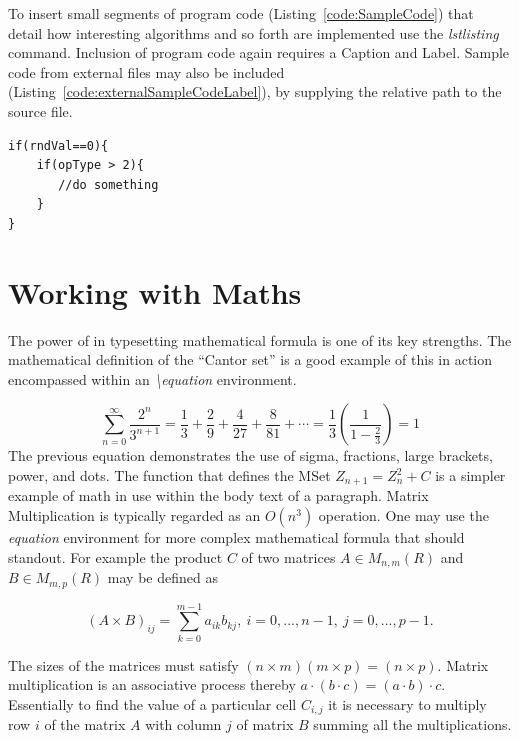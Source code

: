 To insert small segments of program code (Listing~\ref{code:SampleCode}) that detail how interesting algorithms and so forth are implemented use the \emph{lstlisting} command. Inclusion of program code again requires a Caption and Label. Sample code from external files may also be included (Listing~\ref{code:externalSampleCodeLabel}), by supplying the relative path to the source file. 

\begin{lstlisting}[caption=Sample Program Code Listing, label=code:SampleCode]
if(rndVal==0){
    if(opType > 2){
       //do something
    }
}
\end{lstlisting}




\section{Working with Maths}
The power of \latex in typesetting mathematical formula is one of its key strengths. The mathematical definition of the ``Cantor set'' is a good example of this in action encompassed within an \emph{\textbackslash equation} environment.

\begin{equation}
\displaystyle\sum_{n=0}^\infty \frac{2^n}{3^{n+1}} = \frac{1}{3} +
\frac{2}{9} + \frac{4}{27} + \frac{8}{81} + \cdots =
\frac{1}{3}\left(\frac{1}{1-\frac{2}{3}}\right) = 1
\end{equation}
 The previous equation demonstrates the use of sigma, fractions, large brackets, power, and dots. The function that defines the MSet $Z_{n+1} =
Z_{n}^2 + C$ is a simpler example of math in use within the body text of a paragraph. Matrix Multiplication is typically regarded as an $O(n^3)$
operation. One may use the \emph{equation} environment for more complex mathematical formula that should standout. For example the product  $C$ of two matrices $A \in M_{n,m}(R)$ and $B \in
M_{m,p}(R)$ may be defined as

\begin{equation}
(A \times B)_{ij} = \sum_{k=0} ^{m-1} a_{ik}b_{kj},~
i=0,...,n-1,~j=0,...,p-1.
\end{equation}

The sizes of the matrices must satisfy $(n \times m)(m \times p) =
(n \times p)$. Matrix multiplication is an associative process
thereby $a\cdot(b \cdot c) = (a \cdot b) \cdot c$. Essentially to
find the value of a particular cell $C_{i,j}$ it is necessary to
multiply row $i$ of the matrix $A$ with column $j$ of matrix $B$
summing all the multiplications.

